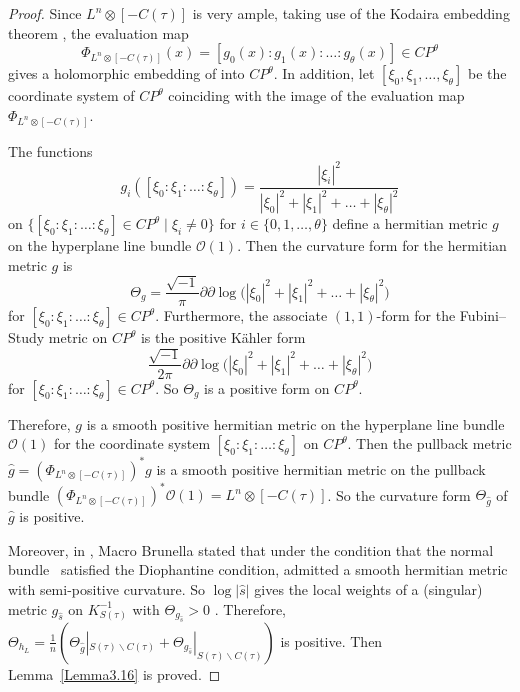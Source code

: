 \documentclass[10pt,a4paper]{amsart}
\numberwithin{equation}{section}
\def\operatorname#1{#1}
\def\overline#1{#1}
\begin{document}
\begin{proof}
Since $L^n \otimes [-C(\tau)]$ is very ample, taking use of the Kodaira embedding theorem \cite{Phillip}, the evaluation map
\[\Phi_{L^n \otimes [-C(\tau)]}(x)=[g_0(x):g_1(x):\dots :g_{\theta}(x)]\in \operatorname{CP}^{\theta}\]
gives a holomorphic embedding of \smash{$S(\tau) \cong \operatorname{CP}^2 \#9\overline{\operatorname{CP}}^2$} into $\operatorname{CP}^{\theta}$. In addition, let $[\xi_0,\xi_1,\dots ,\xi_{\theta}]$ be the coordinate system of $\operatorname{CP}^{\theta}$ coinciding with the image of the evaluation map $\Phi_{L^n \otimes [-C(\tau)]}$.

The functions
\[
g_i([\xi_0:\xi_1:\dots :\xi_{\theta}])=\frac{|\xi_i|^2}{|\xi_0|^2+|\xi_1|^2+\dots +|\xi_{\theta}|^2}
\]
on $\big \{ [\xi_0:\xi_1:\dots :\xi_{\theta}]\in \operatorname{CP}^\theta\mid \xi_i\neq 0\big \}$ for $i \in \{ 0,1,\dots ,\theta \}$ define a hermitian metric $g$ on the hyperplane line bundle $\mathcal{O}(1)$. Then the curvature form for the hermitian metric $g$ is
\[
\Theta_g=\frac{\sqrt{-1}}{\pi}\partial\overline{\partial}\log\bigl(|\xi_0|^2+|\xi_1|^2+\dots +|\xi_{\theta}|^2\bigr)
\]
for $[\xi_0:\xi_1:\dots :\xi_{\theta}]\in \operatorname{CP}^\theta$. Furthermore, the associate $(1,1)$-form for the Fubini--Study metric on $\operatorname{CP}^\theta$ is the positive K\"ahler form
\[\frac{\sqrt{-1}}{2\pi}\partial\overline{\partial}\log\bigl(|\xi_0|^2+|\xi_1|^2+\dots +|\xi_{\theta}|^2\bigr)\]
for $[\xi_0:\xi_1:\dots :\xi_{\theta}]\in \operatorname{CP}^\theta$. So $\Theta_g$ is a positive form on $\operatorname{CP}^\theta$.

Therefore, $g$ is a smooth positive hermitian metric on the hyperplane line bundle $\mathcal{O}(1)$ for the coordinate system $[\xi_0:\xi_1:\dots :\xi_{\theta}]$ on $\operatorname{CP}^{\theta}$. Then the pullback metric $\hat{g}=(\Phi_{L^n \otimes [-C(\tau)]})^*g$ is a smooth positive hermitian metric on the pullback bundle $(\Phi_{L^n \otimes [-C(\tau)]})^*\mathcal{O}(1)=L^n \otimes [-C(\tau)]$. So the curvature form $\Theta_{\hat{g}}$ of $\hat{g}$ is positive.

Moreover, in \cite{Marco}, Macro Brunella stated that under the condition that the normal bundle~ satisfied the Diophantine condition,  admitted a smooth hermitian metric with semi-positive curvature. So $\log|\hat{s}|$ gives the local weights of a (singular) metric $g_{\hat{s}}$ on $K^{-1}_{S(\tau)}$ with $\Theta_{g_{\hat{s}}}>0$ \cite[Definition~8.7]{Vincent-Ahmed}. Therefore, $\Theta_{h_L}=\frac{1}{n}(\Theta_{\hat{g}}|_{S(\tau)\backslash C(\tau)}+\Theta_{g_{\hat{s}}}|_{S(\tau)\backslash C(\tau)})$ is positive. Then Lemma~\ref{Lemma3.16} is proved. \end{proof}
\end{document}
